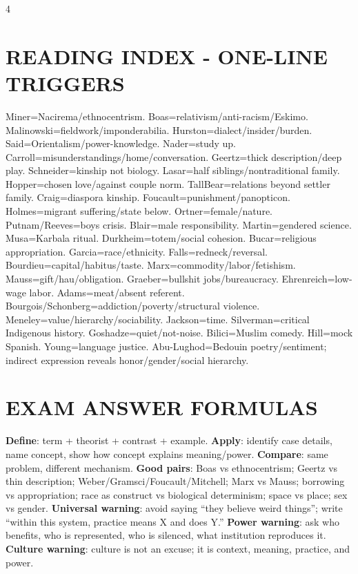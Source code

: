 \documentclass[10pt,landscape]{article}
\newcommand{\kw}[1]{\textbf{#1}}
\begin{document}
\begin{multicols*}{4}
\section*{READING INDEX - ONE-LINE TRIGGERS}
Miner=Nacirema/ethnocentrism. Boas=relativism/anti-racism/Eskimo. Malinowski=fieldwork/imponderabilia. Hurston=dialect/insider/burden. Said=Orientalism/power-knowledge. Nader=study up. Carroll=misunderstandings/home/conversation. Geertz=thick description/deep play. Schneider=kinship not biology. Lasar=half siblings/nontraditional family. Hopper=chosen love/against couple norm. TallBear=relations beyond settler family. Craig=diaspora kinship. Foucault=punishment/panopticon. Holmes=migrant suffering/state below. Ortner=female/nature. Putnam/Reeves=boys crisis. Blair=male responsibility. Martin=gendered science. Musa=Karbala ritual. Durkheim=totem/social cohesion. Bucar=religious appropriation. Garcia=race/ethnicity. Falls=redneck/reversal. Bourdieu=capital/habitus/taste. Marx=commodity/labor/fetishism. Mauss=gift/hau/obligation. Graeber=bullshit jobs/bureaucracy. Ehrenreich=low-wage labor. Adams=meat/absent referent. Bourgois/Schonberg=addiction/poverty/structural violence. Meneley=value/hierarchy/sociability. Jackson=time. Silverman=critical Indigenous history. Goshadze=quiet/not-noise. Bilici=Muslim comedy. Hill=mock Spanish. Young=language justice. Abu-Lughod=Bedouin poetry/sentiment; indirect expression reveals honor/gender/social hierarchy.

\section*{EXAM ANSWER FORMULAS}
\kw{Define}: term + theorist + contrast + example. \kw{Apply}: identify case details, name concept, show how concept explains meaning/power. \kw{Compare}: same problem, different mechanism. \kw{Good pairs}: Boas vs ethnocentrism; Geertz vs thin description; Weber/Gramsci/Foucault/Mitchell; Marx vs Mauss; borrowing vs appropriation; race as construct vs biological determinism; space vs place; sex vs gender. \kw{Universal warning}: avoid saying ``they believe weird things''; write ``within this system, practice means X and does Y.'' \kw{Power warning}: ask who benefits, who is represented, who is silenced, what institution reproduces it. \kw{Culture warning}: culture is not an excuse; it is context, meaning, practice, and power.

\end{multicols*}
\end{document}
